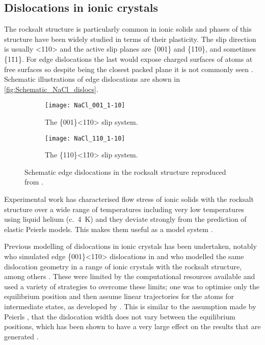 \subsection{Dislocations in ionic crystals}
The rocksalt structure is particularly common in ionic solids and phases of this structure have been widely studied in terms of their plasticity. The slip direction is usually <110> and the active slip planes are \{001\} and \{1\={1}0\}, and sometimes \{1\={1}1\}. For edge dislocations the last would expose charged surfaces of atoms at free surfaces so despite being the closest packed plane it is not commonly seen \cite{Haasen1985}. Schematic illustrations of edge dislocations are shown in \autoref{fig:Schematic_NaCl_dislocs}.

\begin{figure}
\centering
    \begin{subfigure}{0.8\textwidth}
    \centering
    \texttt{[image: NaCl\_001\_1-10]}
    \caption{The \{001\}<1\={1}0> slip system.}
    \end{subfigure}
\par\bigskip
    \begin{subfigure}{0.8\textwidth}
    \centering
    \texttt{[image: NaCl\_110\_1-10]}
    \caption{The \{110\}<1\={1}0> slip system.}
    \end{subfigure}
\caption{Schematic edge dislocations in the rocksalt structure reproduced from \cite{Haasen1985}. \label{fig:Schematic_NaCl_dislocs}}
\end{figure}





Experimental work has characterised flow stress of ionic solids with the rocksalt structure over a wide range of temperatures including very low temperatures using liquid helium (c.~\SI{4}{\kelvin}) \cite{Haasen1985} and they deviate strongly from the prediction of elastic Peierls models. This makes them useful as a model system \cite{wang1996}.

Previous modelling of dislocations in ionic crystals has been undertaken, notably \citet{puls1976} who simulated edge \{001\}<1\={1}0> dislocations in  and \citet{Woo1977} who modelled the same dislocation geometry in a range of ionic crystals with the rocksalt structure, among others \cite{Granzer1968,Woo1976,Hoagland1976,Brandt1987,Soullard1991,Foitzik1991}. These were limited by the computational resources available and used a variety of strategies to overcome these limits; one was to optimise only the equilibrium position and then assume linear trajectories for the atoms for intermediate states, as developed by \citet{Granzer1968}. This is similar to the assumption made by Peierls \cite{Peierls1940}, that the dislocation width does not vary between the equilibrium positions, which has been shown to have a very large effect on the results that are generated \cite{Clegg2006}.

